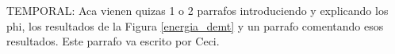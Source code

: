\documentclass[namedreferences]{solarphysics}
\def\temp#1{\textcolor{mygray}{TEMPORAL: #1}}
\begin{document}
\begin{article}


\temp{Aca vienen quizas 1 o 2 parrafos introduciendo y explicando los phi, los resultados de la Figura \ref{energia_demt} y un parrafo comentando esos resultados. Este parrafo va escrito por Ceci.}



\end{article}
\end{document}
